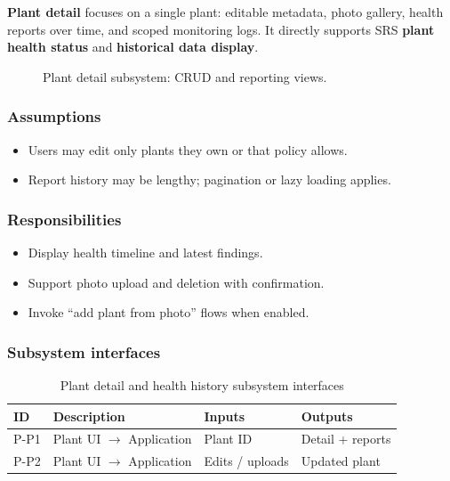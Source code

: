 \textbf{Plant detail} focuses on a single plant: editable metadata, photo gallery, health reports over time, and scoped monitoring logs. It directly supports SRS \textbf{plant health status} and \textbf{historical data display}.

\begin{figure}[H]
\centering
{}
\caption{Plant detail subsystem: CRUD and reporting views.}
\label{fig:pres-plant}
\end{figure}

\subsubsection{Assumptions}
\begin{itemize}
  \item Users may edit only plants they own or that policy allows.
  \item Report history may be lengthy; pagination or lazy loading applies.
\end{itemize}

\subsubsection{Responsibilities}
\begin{itemize}
  \item Display health timeline and latest findings.
  \item Support photo upload and deletion with confirmation.
  \item Invoke ``add plant from photo'' flows when enabled.
\end{itemize}

\subsubsection{Subsystem interfaces}
\begin{table}[H]
\centering
\small
\begin{tabular}{|p{0.9cm}|p{3.4cm}|p{3.0cm}|p{3.5cm}|}
\hline
\textbf{ID} & \textbf{Description} & \textbf{Inputs} & \textbf{Outputs} \\
\hline
P-P1 & Plant UI $\rightarrow$ Application & Plant ID & Detail + reports \\
\hline
P-P2 & Plant UI $\rightarrow$ Application & Edits / uploads & Updated plant \\
\hline
\end{tabular}
\caption{Plant detail and health history subsystem interfaces}
\end{table}

